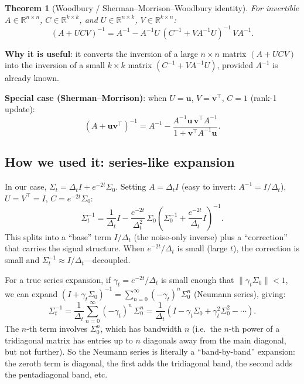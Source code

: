 \documentclass[11pt,a4paper]{article}
\newtheorem{theorem}{Theorem}[section]
\newcommand{\R}{\mathbb{R}}
\newcommand{\Dt}{\Delta_t}
\begin{document}
\begin{theorem}[Woodbury / Sherman--Morrison--Woodbury identity]
For invertible $A \in \R^{n \times n}$, $C \in \R^{k \times k}$, and $U \in \R^{n \times k}$, $V \in \R^{k \times n}$:
\begin{equation}\label{eq:woodbury-general}
  (A + UCV)^{-1} = A^{-1} - A^{-1}U\,(C^{-1} + VA^{-1}U)^{-1}\,VA^{-1}.
\end{equation}
\end{theorem}

\textbf{Why it is useful}: it converts the inversion of a large $n \times n$ matrix $(A + UCV)$ into the inversion of a small $k \times k$ matrix $(C^{-1} + VA^{-1}U)$, provided $A^{-1}$ is already known.

\textbf{Special case (Sherman--Morrison)}: when $U = \mathbf{u}$, $V = \mathbf{v}^\top$, $C = 1$ (rank-1 update):
\begin{equation}
  (A + \mathbf{u}\mathbf{v}^\top)^{-1} = A^{-1} - \frac{A^{-1}\mathbf{u}\,\mathbf{v}^\top A^{-1}}{1 + \mathbf{v}^\top A^{-1}\mathbf{u}}.
\end{equation}

\subsection{How we used it: series-like expansion}

In our case, $\Sigma_t = \Dt I + e^{-2t}\Sigma_0$.  Setting $A = \Dt I$ (easy to invert: $A^{-1} = I/\Dt$), $U = V^\top = I$, $C = e^{-2t}\Sigma_0$:
\begin{equation}
  \Sigma_t^{-1} = \frac{1}{\Dt}I - \frac{e^{-2t}}{\Dt^2}\,\Sigma_0\!\left(\Sigma_0^{-1} + \frac{e^{-2t}}{\Dt}I\right)^{-1}.
\end{equation}
This splits into a ``base'' term $I/\Dt$ (the noise-only inverse) plus a ``correction'' that carries the signal structure.  When $e^{-2t}/\Dt$ is small (large $t$), the correction is small and $\Sigma_t^{-1} \approx I/\Dt$---decoupled.

For a true series expansion, if $\gamma_t = e^{-2t}/\Dt$ is small enough that $\|\gamma_t \Sigma_0\| < 1$, we can expand $(I + \gamma_t \Sigma_0)^{-1} = \sum_{n=0}^{\infty}(-\gamma_t)^n \Sigma_0^n$ (Neumann series), giving:
\begin{equation}
  \Sigma_t^{-1} = \frac{1}{\Dt}\sum_{n=0}^{\infty}(-\gamma_t)^n\,\Sigma_0^n = \frac{1}{\Dt}\left(I - \gamma_t\Sigma_0 + \gamma_t^2\Sigma_0^2 - \cdots\right).
\end{equation}
The $n$-th term involves $\Sigma_0^n$, which has bandwidth $n$ (i.e.\ the $n$-th power of a tridiagonal matrix has entries up to $n$ diagonals away from the main diagonal, but not further).  So the Neumann series is literally a ``band-by-band'' expansion: the zeroth term is diagonal, the first adds the tridiagonal band, the second adds the pentadiagonal band, etc.
\end{document}
